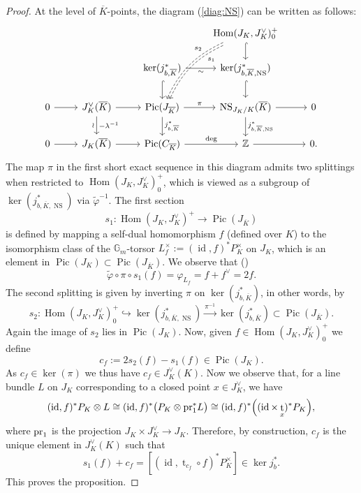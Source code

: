 \documentclass[11pt,oneside]{amsart}
\theoremstyle{plain}
\theoremstyle{definition}
\def\lra{{\longrightarrow}}
\def\G{{\bf G}}
\DeclareMathOperator{\NS}{NS}
\DeclareMathOperator{\Pic}{Pic}
\DeclareMathOperator{\id}{id} \DeclareMathOperator{\Sel}{Sel}
\DeclareMathOperator{\Hom}{Hom}
\DeclareMathOperator{\tr}{t}
\def\Z{\mathbb{Z}}
\def\G{\mathbb{G}}
\def\ra{\rightarrow}
\begin{document}
\begin{proof}
At the level of $\overline{ K}$-points, the diagram (\ref{diag:NS}) can be written as follows: 
\begin{equation}\label{diag:NSK}
\begin{tikzcd}[bend angle = 20]
& & &  \Hom(J_K, J_K^\vee)_0^+ \arrow[d, hook] \arrow[ddl, dashed, bend right, start anchor={[shift={(0pt,-3pt)}]}, end anchor={[shift={(3pt,0pt)}]}, near start, "s_1"] \arrow[ddl, dashed, bend right, swap, near start, "s_2"] \\
&  & \ker (j_{b,\overline{ K}}^*) \arrow[r, swap, "\sim"] \arrow[hook]{d}
  & \ker (j_{b, \overline{K}, \NS}^*) \arrow[hook]{d} %
\\
  0 \arrow{r}
  & J_K^\vee(\overline{K}) \arrow{r} \arrow{d}{-\lambda^{-1}}[swap]{\wr}
  & \Pic(J_{\overline{K}}) \arrow{r}{\pi} \arrow{d}{j_{b, \overline{K}}^*}
  & \NS_{J_K/K}(\overline{K}) \arrow{r} \arrow{d}{j_{b,\overline{K}, \NS}^*}
  & 0 \\
  0 \arrow{r}
  & J_K(\overline{K}) \arrow{r}
  & \Pic(C_{\overline{K}}) \arrow{r}{\deg}
  & \Z \arrow{r}
  & 0.
\end{tikzcd}
\end{equation}
The map $\pi$ in the first  short exact sequence in this diagram admits two splittings when restricted to $ \Hom(J_K, J_K^\vee)_0^+$, which is viewed as a subgroup of $\ker (j_{b, \overline{K}, \NS}^*)$ via $\tilde \varphi^{-1}$. The first section 
 $$s_1 : \Hom(J_K, J_K^\vee)^+ \lra \Pic(J_{\overline K})$$
  is defined by mapping a self-dual homomorphism $f$ (defined over $K$) to the isomorphism class of the $\G_m$-torsor $L_f^\times:=(\id, f)^* P_K^\times$ on $J_K$, which is an element in $\Pic (J_K) \subset \Pic (J_{\overline{K}})$. 
We observe that  (\cite[Proposition 11.1]{EGM})
$$
\tilde{\varphi}\circ \pi \circ s_1(f)=\varphi_{L_f}=f+f^\vee=2f. 
$$
 The second splitting is given by inverting $\pi$ on $\ker (j_{b, \overline{K}}^*)$, in other words, by 
 $$
s_2 :\Hom(J_K, J_K^\vee)_0^+  \hookrightarrow \ker (j_{b, \overline{K}, \NS}^*)  \overset{\pi^{-1}}{\lra} \ker (j_{b, \overline{K}}^*) \subset \Pic(J_{\overline{K}}).$$
Again the image of $s_2$  lies in $\Pic(J_K).$ Now, given $f\in \Hom(J_K, J_K^\vee)_0^+$ we define 
$$
c_f:=2s_2(f)-s_1(f)\in \Pic (J_K).
$$
As $ c_f \in \ker (\pi)$ we thus have $c_f \in J_K^{\vee} (K)$. Now we observe that, for a line bundle $L$ on $J_K$ corresponding to a closed point $x \in J_K^\vee$,  we have
$$(\id, f)^* P_K \otimes L \cong (\id, f)^* \big( P_K \otimes \textup{pr}_1^* L \big) \cong (\id, f)^* \Big( (\id \times \tr_{x})^* P_K  \Big),$$
where $\textup{pr}_1$ is the projection $J_K \times J_K^\vee \ra J_K$. 
Therefore, by construction, $c_f$ is the unique element in $J_K^\vee(K)$ such that
$$
s_1(f)+c_f=[(\id, \tr_{c_f}\circ f)^* P_K^\times]\in \ker j_{b}^*.
$$
This proves the proposition. 
\end{proof}
\end{document}
